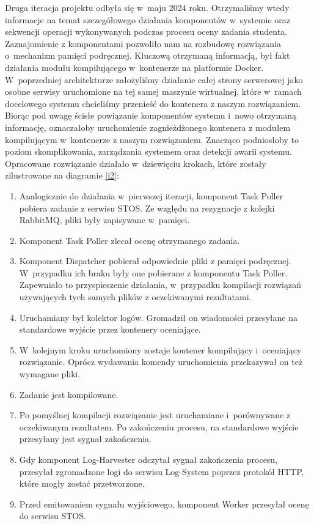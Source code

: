 Druga iteracja projektu odbyła się w~maju 2024 roku. Otrzymaliśmy wtedy informacje na temat szczegółowego działania komponentów w~systemie oraz sekwencji operacji wykonywanych podczas procesu oceny zadania studenta. Zaznajomienie z komponentami pozwoliło nam na rozbudowę rozwiązania o~mechanizm pamięci podręcznej. Kluczową otrzymaną informacją, był fakt działania modułu kompilującego w~kontenerze na platformie Docker. W~poprzedniej architekturze założyliśmy działanie całej strony serwerowej jako osobne serwisy uruchomione na tej samej maszynie wirtualnej, które w~ramach docelowego systemu chcieliśmy przenieść do kontenera z naszym rozwiązaniem. Biorąc pod uwagę ścisłe powiązanie komponentów systemu i~nowo otrzymaną informację, oznaczałoby uruchomienie zagnieżdżonego kontenera z modułem kompilującym w~kontenerze z naszym rozwiązaniem. Znacząco podniosłoby to poziom skomplikowania, zarządzania systemem oraz detekcji awarii systemu. Opracowane rozwiązanie działało w~dziewięciu krokach, które zostały zilustrowane na diagramie \ref{i2}:
\begin{enumerate}
	\item Analogicznie do działania w~pierwszej iteracji, komponent Task Poller pobiera zadanie z serwisu STOS. Ze względu na rezygnacje z kolejki RabbitMQ, pliki były zapisywane w~pamięci.
	\item Komponent Task Poller zlecał ocenę otrzymanego zadania.
	\item Komponent Dispatcher pobierał odpowiednie pliki z pamięci podręcznej. W~przypadku ich braku były one pobierane z komponentu Task Poller. Zapewniało to przyspieszenie działania, w~przypadku kompilacji rozwiązań używających tych samych plików z oczekiwanymi rezultatami.
	\item Uruchamiany był kolektor logów. Gromadził on wiadomości przesyłane na standardowe wyjście przez kontenery oceniające.
	\item W~kolejnym kroku uruchomiony zostaje kontener kompilujący i~oceniający rozwiązanie. Oprócz wydawania komendy uruchomienia przekazywał on też wymagane pliki.
	\item Zadanie jest kompilowane.
	\item Po pomyślnej kompilacji rozwiązanie jest uruchamiane i~porównywane z oczekiwanym rezultatem. Po zakończeniu procesu, na standardowe wyjście przesyłany jest sygnał zakończenia.
	\item Gdy komponent Log-Harvester odczytał sygnał zakończenia procesu, przesyłał zgromadzone logi do serwisu Log-System poprzez protokół HTTP, które mogły zostać przetworzone.
	\item Przed emitowaniem sygnału wyjściowego, komponent Worker przesyłał ocenę do serwisu STOS.
\end{enumerate}
